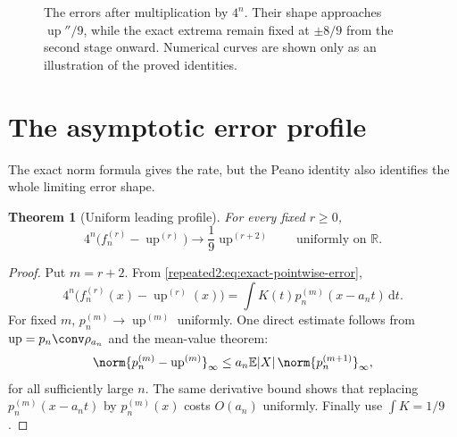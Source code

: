\documentclass[11pt,oneside]{article}
\newtheorem{theorem}{Theorem}[section]
\theoremstyle{definition}
\theoremstyle{remark}
\newcommand{\R}{\mathbb R}
\newcommand{\Up}{\operatorname{up}}
\newcommand{\dd}{\,\mathrm d}
\newcommand{\E}{\mathbb E}
\begin{document}
\begin{figure}[htbp]
\caption{The errors after multiplication by $4^n$.  Their shape approaches $\Up''/9$, while
the exact extrema remain fixed at $\pm8/9$ from the second stage onward.  Numerical curves are
shown only as an illustration of the proved identities.}
\label{repeated2:fig:scaled-errors-supplement}
\end{figure}


\section{The asymptotic error profile}
\label{repeated2:sec:asymptotic-profile}

The exact norm formula gives the rate, but the Peano identity also identifies the whole
limiting error shape.

\begin{theorem}[Uniform leading profile]
\label{repeated2:thm:leading-profile}
For every fixed $r\ge0$,
\begin{equation}
 4^n\bigl(f_n^{(r)}-\Up^{(r)}\bigr)
 \longrightarrow \frac19\Up^{(r+2)}
 \qquad\text{uniformly on }\R.
 \label{repeated2:eq:leading-profile}
\end{equation}
\end{theorem}

\begin{proof}
Put $m=r+2$.  From \eqref{repeated2:eq:exact-pointwise-error},
\[
 4^n\bigl(f_n^{(r)}(x)-\Up^{(r)}(x)\bigr)
 =\int K(t)p_n^{(m)}(x-a_nt)\dd t.
\]
For fixed $m$, $p_n^{(m)}\to\Up^{(m)}$ uniformly.  One direct estimate follows from
$\Up=p_n\conv\rho_{a_n}$ and the mean-value theorem:
\[
 \norm{p_n^{(m)}-\Up^{(m)}}_\infty
 \le a_n\E|X|\,\norm{p_n^{(m+1)}}_\infty,
\]
for all sufficiently large $n$.  The same derivative bound shows that replacing
$p_n^{(m)}(x-a_nt)$ by $p_n^{(m)}(x)$ costs $O(a_n)$ uniformly.  Finally use
$\int K=1/9$.
\end{proof}
\end{document}
